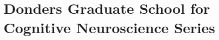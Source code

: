\clearpage

\chapter*{Donders Graduate School for Cognitive Neuroscience Series}
{}%

\npar\npar
\footnotesize
\noindent

\newcommand{\dientry}[8]{%
\noindent #1. #2 (#3). %
\IfSubStr{#8}{/}{%
\href{http://dx.doi.org/#8}{\emph{#4}}
}{%
\emph{#4}
}%
#5, #6, #7\npar%
}
{
\footnotesize
\begin{multicols}{2}

\end{multicols}
}
